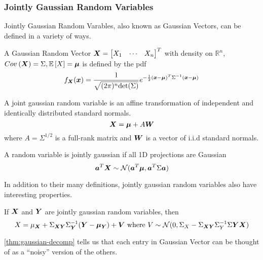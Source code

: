\subsubsection{Jointly Gaussian Random Variables}
Jointly Gaussian Random Varables, also known as Gaussian Vectors, can be defined in a variety of ways.
\begin{definition}
	A Gaussian Random Vector $\boldsymbol{X} = \begin{bmatrix} X_1 & \cdots & X_n \end{bmatrix}^T$ with density on $\mathbb{R}^n$, $Cov\left(\boldsymbol{X}\right)=\Sigma, \mathbb{E}\left[X\right]=\boldsymbol{\mu}$ is defined by the pdf
	\[
		f_{\boldsymbol{X}}(\boldsymbol{x}) = \frac{1}{\sqrt{(2\pi)^n\text{det}(\Sigma)}}e^{-\frac{1}{2}(\boldsymbol{x}-\boldsymbol{\mu})^T\Sigma^{-1}(\boldsymbol{x}-\boldsymbol{\mu})}
	\]
	\label{defn:joint-gaussian-1}
\end{definition}
\begin{definition}
		A joint gaussian random variable is an affine transformation of independent and identically distributed standard normals.
		\[
			\boldsymbol{X} = \boldsymbol{\mu}+A\boldsymbol{W}
		\] where $A=\Sigma^{1/2}$ is a full-rank matrix and $\boldsymbol{W}$ is a vector of i.i.d standard normals.
	\label{defn:joint-gaussian-2}
\end{definition}
\begin{definition}
	A random variable is jointly gaussian if all 1D projections are Gaussian
	\[
		\boldsymbol{a}^T\boldsymbol{X} \sim \mathcal{N}(\boldsymbol{a}^T\boldsymbol{\mu}, \boldsymbol{a}^T\Sigma\boldsymbol{a})
	\]
	\label{defn:joint-gaussian-3}
\end{definition}
In addition to their many definitions, jointly gaussian random variables also have interesting properties.
\begin{theorem}
	If $\boldsymbol{X}$ and $\boldsymbol{Y}$ are jointly gaussian random variables, then \[
		X = \mu_{\boldsymbol{X}}+\Sigma_{\boldsymbol{XY}}\Sigma_{\boldsymbol{Y}}^{-1}(\boldsymbol{Y} - \boldsymbol{\mu_Y}) + \boldsymbol{V} \text{ where } V \sim \mathcal{N}(0, \Sigma_X-\Sigma_{\boldsymbol{XY}}\Sigma_Y^{-1}\Sigma{\boldsymbol{YX}})
	\]
	\label{thm:gaussian-decomp}
\end{theorem}
\cref{thm:gaussian-decomp} tells us that each entry in Gaussian Vector can be thought of as a ``noisy'' version of the others.
